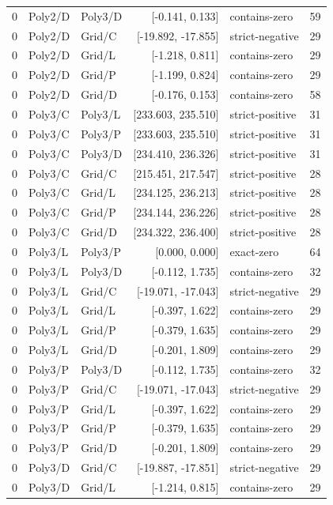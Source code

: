 \begin{longtable}{lllrlr}
0 & Poly2/D & Poly3/D & [-0.141, 0.133] & contains-zero & 59 \\
0 & Poly2/D & Grid/C & [-19.892, -17.855] & strict-negative & 29 \\
0 & Poly2/D & Grid/L & [-1.218, 0.811] & contains-zero & 29 \\
0 & Poly2/D & Grid/P & [-1.199, 0.824] & contains-zero & 29 \\
0 & Poly2/D & Grid/D & [-0.176, 0.153] & contains-zero & 58 \\
0 & Poly3/C & Poly3/L & [233.603, 235.510] & strict-positive & 31 \\
0 & Poly3/C & Poly3/P & [233.603, 235.510] & strict-positive & 31 \\
0 & Poly3/C & Poly3/D & [234.410, 236.326] & strict-positive & 31 \\
0 & Poly3/C & Grid/C & [215.451, 217.547] & strict-positive & 28 \\
0 & Poly3/C & Grid/L & [234.125, 236.213] & strict-positive & 28 \\
0 & Poly3/C & Grid/P & [234.144, 236.226] & strict-positive & 28 \\
0 & Poly3/C & Grid/D & [234.322, 236.400] & strict-positive & 28 \\
0 & Poly3/L & Poly3/P & [0.000, 0.000] & exact-zero & 64 \\
0 & Poly3/L & Poly3/D & [-0.112, 1.735] & contains-zero & 32 \\
0 & Poly3/L & Grid/C & [-19.071, -17.043] & strict-negative & 29 \\
0 & Poly3/L & Grid/L & [-0.397, 1.622] & contains-zero & 29 \\
0 & Poly3/L & Grid/P & [-0.379, 1.635] & contains-zero & 29 \\
0 & Poly3/L & Grid/D & [-0.201, 1.809] & contains-zero & 29 \\
0 & Poly3/P & Poly3/D & [-0.112, 1.735] & contains-zero & 32 \\
0 & Poly3/P & Grid/C & [-19.071, -17.043] & strict-negative & 29 \\
0 & Poly3/P & Grid/L & [-0.397, 1.622] & contains-zero & 29 \\
0 & Poly3/P & Grid/P & [-0.379, 1.635] & contains-zero & 29 \\
0 & Poly3/P & Grid/D & [-0.201, 1.809] & contains-zero & 29 \\
0 & Poly3/D & Grid/C & [-19.887, -17.851] & strict-negative & 29 \\
0 & Poly3/D & Grid/L & [-1.214, 0.815] & contains-zero & 29 \\

\end{longtable}
